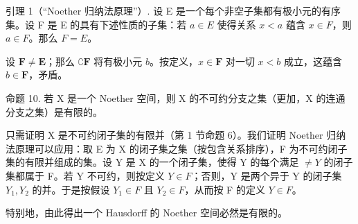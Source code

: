 引理 1（``Noether 归纳法原理''）. 设 E 是一个每个非空子集都有极小元的有序集。设 F 是 E 的具有下述性质的子集：若 \(a \in E\) 使得关系 \(x < a\) 蕴含 \(x \in F\)，则 \(a \in F\)。那么 \(F = E\)。

设 \(\mathbf{F} \neq \mathbf{E}\)；那么 \(\complement\mathbf{F}\) 将有极小元 \(b\)。按定义，\(x \in \mathbf{F}\) 对一切 \(x < b\) 成立，这蕴含 \(b \in \mathbf{F}\)，矛盾。

命题 10. 若 X 是一个 Noether 空间，则 X 的不可约分支之集（更加，X 的连通分支之集）是有限的。

只需证明 X 是不可约闭子集的有限并（第 1 节命题 6）。我们证明 Noether 归纳法原理可以应用：取 E 为 X 的闭子集之集（按包含关系排序），F 为不可约闭子集的有限并组成的集。设 Y 是 X 的一个闭子集，使得 Y 的每个满足 \(\neq Y\) 的闭子集都属于 F。若 Y 不可约，则按定义 \(Y \in F\)；否则，Y 是两个异于 Y 的闭子集 \(Y_{1}, Y_{2}\) 的并。于是按假设 \(Y_{1} \in F\) 且 \(Y_{2} \in F\)，从而按 F 的定义 \(Y \in F\)。

特别地，由此得出一个 Hausdorff 的 Noether 空间必然是有限的。

